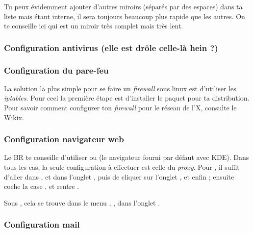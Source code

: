 Tu peux \'evidemment ajouter d'autres miroirs (s\'epar\'es par des espaces) dans ta liste mais
 \'etant interne, il sera toujours beaucoup plus rapide que les autres. On te
conseille ici  qui est un miroir tr\`es complet mais tr\`es lent.



\subsubsection{Configuration antivirus \footnotesize{(elle est dr\^ole celle-l\`a hein ?)}
}

\subsubsection{Configuration du pare-feu}

La solution la plus simple pour se faire un \emph{firewall} sous linux est d'utiliser les \emph{iptables}. Pour ceci la premi\`ere \'etape est
d'installer le paquet  pour ta distribution. Pour savoir comment configurer ton \emph{firewall} pour le r\'eseau de l'X, consulte le Wikix.

\subsubsection{Configuration navigateur web}

 Le BR te conseille d'utiliser  ou
 (le navigateur fourni par d\'efaut avec KDE). Dans tous les cas, la seule
configuration \`a effectuer est celle du \emph{proxy}. Pour , il suffit d'aller dans
,  et dans l'onglet , puis de cliquer sur l'onglet
, et enfin  ; ensuite coche la case , et rentre .

Sous , cela se trouve dans le menu , ,
dans l'onglet .


\pagebreak

\subsubsection{Configuration mail}

